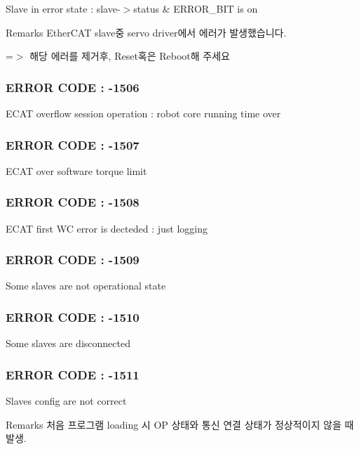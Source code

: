 Slave in error state \-: slave-\/$>$status \& E\-R\-R\-O\-R\-\_\-\-B\-I\-T is on \begin{DoxyRemark}{Remarks}
Ether\-C\-A\-T slave중 servo driver에서 에러가 발생했습니다. \par
 =$>$ 해당 에러를 제거후, Reset혹은 Reboot해 주세요
\end{DoxyRemark}


 \subsubsection*{E\-R\-R\-O\-R C\-O\-D\-E \-: -\/1506 }

E\-C\-A\-T overflow session operation \-: robot core running time over



 \subsubsection*{E\-R\-R\-O\-R C\-O\-D\-E \-: -\/1507 }

E\-C\-A\-T over software torque limit



 \subsubsection*{E\-R\-R\-O\-R C\-O\-D\-E \-: -\/1508 }

E\-C\-A\-T first W\-C error is decteded \-: just logging



 \subsubsection*{E\-R\-R\-O\-R C\-O\-D\-E \-: -\/1509 }

Some slaves are not operational state



 \subsubsection*{E\-R\-R\-O\-R C\-O\-D\-E \-: -\/1510 }

Some slaves are disconnected



 \subsubsection*{E\-R\-R\-O\-R C\-O\-D\-E \-: -\/1511 }

Slaves config are not correct \begin{DoxyRemark}{Remarks}
처음 프로그램 loading 시 O\-P 상태와 통신 연결 상태가 정상적이지 않을 때 발생.
\end{DoxyRemark}


